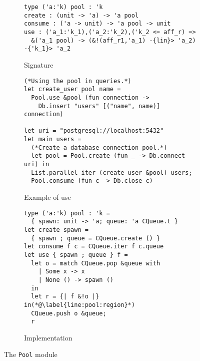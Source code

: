 \begin{figure}[tp]
  \centering
  \begin{subfigure}[t]{0.5\linewidth}
\begin{lstlisting}
type ('a:'k) pool : 'k
create : (unit -> 'a) -> 'a pool
consume : ('a -> unit) -> 'a pool -> unit
use : ('a_1:'k_1),('a_2:'k_2),('k_2 <= aff_r) =>
  &('a_1 pool) -> (&!(aff_r1,'a_1) -{lin}> 'a_2) -{'k_1}> 'a_2
\end{lstlisting}
    \vspace{-8pt}
    \caption{Signature}
    \label{intf:pool}

\begin{lstlisting}
(*Using the pool in queries.*)
let create_user pool name =
  Pool.use &pool (fun connection ->
    Db.insert "users" [("name", name)] connection)

let uri = "postgresql://localhost:5432"
let main users =
  (*Create a database connection pool.*)
  let pool = Pool.create (fun _ -> Db.connect uri) in
  List.parallel_iter (create_user &pool) users;
  Pool.consume (fun c -> Db.close c)
\end{lstlisting}
    \vspace{-8pt}
    \caption{Example of use}
    \label{ex:pool}
  \end{subfigure}
  \hfill
  \begin{subfigure}[t]{0.45\linewidth}
\begin{lstlisting}
type ('a:'k) pool : 'k =
  { spawn: unit -> 'a; queue: 'a CQueue.t }
let create spawn = 
  { spawn ; queue = CQueue.create () }
let consume f c = CQueue.iter f c.queue
let use { spawn ; queue } f =
  let o = match CQueue.pop &queue with
    | Some x -> x
    | None () -> spawn ()
  in
  let r = {| f &!o |} in(*@\label{line:pool:region}*)
  CQueue.push o &queue;
  r
\end{lstlisting}
    \vspace{-8pt}
    \caption{Implementation}
    \label{impl:pool}
  \end{subfigure}

  \caption{The \texttt{Pool} module}
  \label{fig:pool}
\end{figure}


